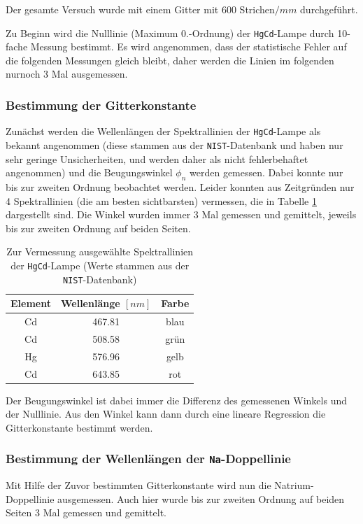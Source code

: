 \documentclass[a4paper, 11pt]{article}
\begin{document}
Der gesamte Versuch wurde mit einem Gitter mit 600 Strichen$/mm$ durchgeführt.

Zu Beginn wird die Nulllinie (Maximum 0.-Ordnung) der \texttt{HgCd}-Lampe durch 10-fache Messung bestimmt. Es wird angenommen, dass der statistische Fehler auf die folgenden Messungen gleich bleibt, daher werden die Linien im folgenden nurnoch 3 Mal ausgemessen.

\subsubsection{Bestimmung der Gitterkonstante}
Zunächst werden die Wellenlängen der Spektrallinien der \texttt{HgCd}-Lampe als bekannt angenommen (diese stammen aus der \texttt{NIST}-Datenbank und haben nur sehr geringe Unsicherheiten, und werden daher als nicht fehlerbehaftet angenommen) und die Beugungswinkel $\phi_n$ werden gemessen. Dabei konnte nur bis zur zweiten Ordnung beobachtet werden. Leider konnten aus Zeitgründen nur 4 Spektrallinien (die am besten sichtbarsten) vermessen, die in Tabelle \ref{table:SpektrumHgCd} dargestellt sind. Die Winkel wurden immer 3 Mal gemessen und gemittelt, jeweils bis zur zweiten Ordnung auf beiden Seiten.

\begin{table}[H]
	\large
	\centering
	\begin{tabular}{|c|c|c|}
		\hline
		Element & Wellenlänge $[nm]$ & Farbe \\
		\hline
		Cd & 467.81 & blau \\
		\hline
		Cd & 508.58 & grün \\
		\hline
		Hg & 576.96 & gelb \\
		\hline
		Cd & 643.85 & rot \\
		\hline
	\end{tabular}
	\caption{Zur Vermessung ausgewählte Spektrallinien der \texttt{HgCd}-Lampe (Werte stammen aus der \texttt{NIST}-Datenbank)}
	\label{table:SpektrumHgCd}
\end{table}

Der Beugungswinkel ist dabei immer die Differenz des gemessenen Winkels und der Nulllinie. Aus den Winkel kann dann durch eine lineare Regression die Gitterkonstante bestimmt werden.

\subsubsection{Bestimmung der Wellenlängen der \texttt{Na}-Doppellinie}
Mit Hilfe der Zuvor bestimmten Gitterkonstante wird nun die Natrium-Doppellinie ausgemessen. Auch hier wurde bis zur zweiten Ordnung auf beiden Seiten 3 Mal gemessen und gemittelt.
\end{document}
